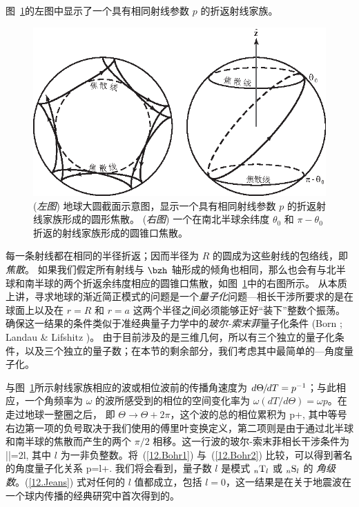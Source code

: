 图~\ref{12.fig.2caustics}的左图中显示了一个具有相同射线参数 $p$ 的折返射线家族。
\begin{figure}[!b]
\begin{center}
\includegraphics{../figures/chap12/fig09.eps}
\end{center}
\caption[JeansRelation]{\label{12.fig.2caustics}
({\em 左图\/}) 地球大圆截面示意图，显示一个具有相同射线参数 $p$ 的折返射线家族形成的圆形焦散。 ({\em 右图\/}) 一个在南北半球余纬度 $\theta_0$ 和 $\pi-\theta_0$ 折返的射线家族形成的圆锥口焦散。}
\end{figure}
每一条射线都在相同的半径折返；因而半径为 $R$ 的圆成为这些射线的包络线，即 {\em 焦散\/}。
%
如果我们假定所有射线与 $\bzh$ 轴形成的倾角也相同，那么也会有与北半球和南半球的两个折返余纬度相应的圆锥口焦散，如图~\ref{12.fig.2caustics}中的右图所示。
从本质上讲，寻求地球的渐近简正模式的问题是一个{\em 量子化\/}问题---相长干涉所要求的是在球面上以及在 $r=R$ 和 $r=a$ 这两个半径之间必须能够正好“装下”整数个振荡。确保这一结果的条件类似于准经典量子力学中的{\em 玻尔-索末菲\/}量子化条件
(Born \citeyear{born27};
Landau \& Lifshitz \citeyear{landau&lifshitz65})。
%
由于目前涉及的是三维几何，所以有三个独立的量子化条件，以及三个独立的量子数；在本节的剩余部分，我们考虑其中最简单的---角度量子化。

与图~\ref{12.fig.2caustics}所示射线家族相应的波或相位波前的传播角速度为
$d\Theta\hspace{-0.3 mm}/\hspace{-0.3 mm}dT=p^{-1}$；与此相应，一个角频率为 $\omega$ 的波所感受到的相位的空间变化率为
$\omega(dT/d\Theta)=\omega p$。在走过地球一整圈之后，
即 $\Theta\rightarrow\Theta+2\pi$，这个波的总的相位累积为
\eq \label{12.Bohr1}
\Delta{}\pi\omega p+\pi,
\en
其中等号右边第一项的负号取决于我们使用的傅里叶变换定义，第二项则是由于通过北半球和南半球的焦散而产生的两个 $\pi/2$ 相移。这一行波的玻尔-索末菲相长干涉条件为
\eq \label{12.Bohr2}
|\Delta\Psi|=2\pi l,
\en
其中 $l$ 为一非负整数。将~(\ref{12.Bohr1}) 与~(\ref{12.Bohr2}) 比较，可以得到著名的角度量子化关系
\eq \label{12.Jeans}
\omega p=l+\half.
\en
我们将会看到，量子数 $l$ 是模式 ${}_n{\rm T}_l$ 或 ${}_n{\rm S}_l$ 的
{\em 角级数\/}。(\ref{12.Jeans}) 式对任何的 $l$ 值都成立，包括 $l=0$，这一结果是\textcite{jeans23}在关于地震波在一个球内传播的经典研究中首次得到的。

